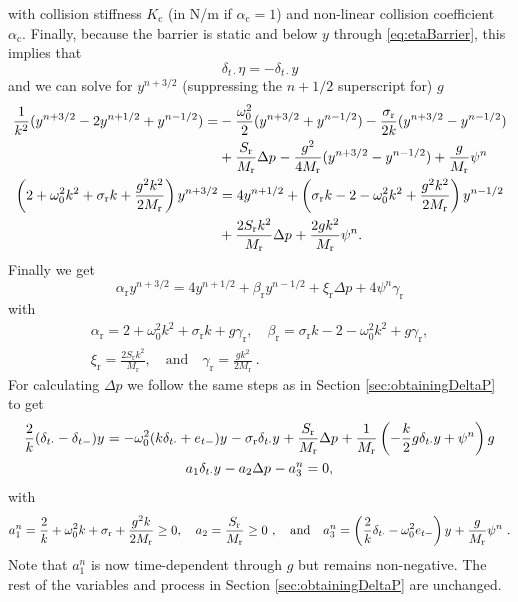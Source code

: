 \documentclass[dvipsnames]{article}
\begin{document}
with collision stiffness $K_\text{c}$ (in N/m if $\alpha_\text{c} = 1$) and non-linear collision coefficient $\alpha_\text{c}$. Finally, because the barrier is static and below $y$ through \eqref{eq:etaBarrier}, this implies that
\begin{equation}\label{eq:etaNegY} 
    \delta_{t\cdot}\eta = -\delta_{t\cdot}y
\end{equation}
and we can solve for $y^{n+3/2}$ (suppressing the $n+1/2$ superscript for) $g$
\begin{align}
    \frac{1}{k^2}(y^{n+3/2} - 2y^{n+1/2} + y^{n-1/2}) = &-\frac{\omega_0^2}{2}(y^{n+3/2}+y^{n-1/2})-\frac{\sigma_\text{r}}{2k}(y^{n+3/2}-y^{n-1/2})\nonumber \\
    &+ \frac{S_\text{r}}{M_\text{r}}\Delta p^{}  -\frac{g^2}{4M_\text{r}}(y^{n+3/2}-y^{n-1/2}) + \frac{g}{M_\text{r}}\psi^n\nonumber\\
    \left(2 + \omega_0^2 k^2 + \sigma_\text{r} k + \frac{g^2k^2}{2M_\text{r}}\right) y^{n+3/2} &= 4y^{n+1/2}+ \left(\sigma_\text{r}k - 2 - \omega_0^2k^2 + \frac{g^2k^2}{2M_\text{r}}\right) y^{n-1/2}\nonumber\\
    &+ \frac{2S_\text{r}k^2}{M_\text{r}}\Delta p^{} + \frac{2gk^2}{M_\text{r}}\psi^n\nonumber.
\end{align}
Finally we get
\begin{equation}\label{eq:lipUpdateWithCollision}
    \alpha_\text{r}y^{n+3/2} = 4 y^{n+1/2} + \beta_\text{r}y^{n-1/2} + \xi_\text{r}\Delta p + 4\psi^n\gamma_\text{r}
\end{equation}
with
\begin{gather}
    \alpha_\text{r} = 2 + \omega_0^2 k^2 + \sigma_\text{r} k + g\gamma_\text{r}, \quad \beta_\text{r} = \sigma_\text{r}k - 2 - \omega_0^2k^2 + g\gamma_\text{r}, \nonumber \\[10pt]
    \xi_\text{r} = \frac{2S_\text{r}k^2}{M_\text{r}}, \quad \text{and} \quad \gamma_\text{r} = \frac{gk^2}{2M_\text{r}}\ .\nonumber
\end{gather}
For calculating $\Delta p$ we follow the same steps as in Section \ref{sec:obtainingDeltaP} to get
\begin{gather}
    \frac{2}{k} (\delta_{t\cdot} - \delta_{t-})y^{} = -\omega_0^2(k\delta_{t\cdot} + e_{t-})y^{} - \sigma_\text{r}\delta_{t\cdot} y^{} + \frac{S_\text{r}}{M_\text{r}}\Delta p^{} + \frac{1}{M_\text{r}}\left(-\frac{k}{2}g\delta_{t\cdot}y+\psi^n\right)g\nonumber\\
    a_1\delta_{t\cdot}y^{} - a_2\Delta p^{} - a_3^n = 0,\label{eq:preAEquation}
\end{gather}
with 
\begin{equation}\label{eq:aColCoeffs}
    a_1^n = \frac{2}{k} + \omega_0^2k + \sigma_\text{r} + \frac{g^2k}{2M_\text{r}} \geq 0, \quad a_2 = \frac{S_\text{r}}{M_\text{r}} \geq 0\ , \quad \text{and} \quad a_3^n = \left(\frac{2}{k} \delta_{t\cdot} - \omega_0^2e_{t-}\right)y^{} + \frac{g}{M_\text{r}}\psi^n\ .
\end{equation}
Note that $a_1^n$ is now time-dependent through $g$ but remains non-negative. The rest of the variables and process in Section \ref{sec:obtainingDeltaP} are unchanged.
\end{document}
